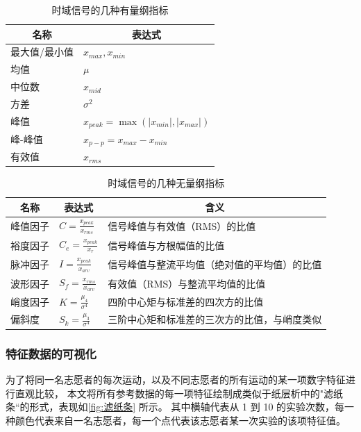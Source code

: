 \documentclass[withoutpreface]{cumcmthesis}
\begin{document}
\begin{table}[!htbp]
\centering
\caption{时域信号的几种有量纲指标}
\begin{tabular}{|l|l|}
\hline
\multicolumn{1}{|c|}{名称} & \multicolumn{1}{c|}{表达式} \\ \hline
最大值/最小值 & $x_{max}, x_{min}$  \\ \hline
均值 & $\mu$  \\ \hline
中位数 & $x_{mid}$ \\ \hline
方差 & $\sigma^2$ \\ \hline
峰值 & $x_{peak} = \max(|x_{min}|, |x_{max}|)$ \\ \hline
峰-峰值 & $x_{p-p} = x_{max} - x_{min}$ \\ \hline
有效值 & $x_{rms}$ \\ \hline
\end{tabular}
\label{chart:features_dimension}
\end{table}

\begin{table}[!htbp]
\centering
\caption{时域信号的几种无量纲指标}
\begin{tabular}{|l|l|l|}
\hline
\multicolumn{1}{|c|}{名称} & \multicolumn{1}{c|}{表达式} & \multicolumn{1}{c|}{含义} \\ \hline
峰值因子 & $C = \frac{x_{peak}}{x_{rms}}$ & 信号峰值与有效值（RMS）的比值 \\ \hline
裕度因子 & $C_e = \frac{x_{peak}}{x_r}$ & 信号峰值与方根幅值的比值 \\ \hline
脉冲因子 & $I = \frac{x_{peak}}{x_{arv}}$ & 信号峰值与整流平均值（绝对值的平均值）的比值 \\ \hline
波形因子 & $S_f = \frac{x_{rms}}{x_{arv}}$ & 有效值（RMS）与整流平均值的比值 \\ \hline
峭度因子 & $K = \frac{\mu_4}{\sigma^4}$ & 四阶中心矩与标准差的四次方的比值 \\ \hline
偏斜度  & $S_k = \frac{\mu_3}{\sigma^4}$ & 三阶中心矩和标准差的三次方的比值，与峭度类似 \\ \hline
\end{tabular}
\label{chart:features_dimensionless}
\end{table}

\subsubsection{特征数据的可视化}

为了将同一名志愿者的每次运动，以及不同志愿者的所有运动的某一项数字特征进行直观比较，
本文将所有参考数据的每一项特征绘制成类似于纸层析中的"滤纸条“的形式，表现如\cref{fig:滤纸条} 所示。
其中横轴代表从 1 到 10 的实验次数，每一种颜色代表来自一名志愿者，每一个点代表该志愿者某一次实验的该项特征值。
\end{document}
